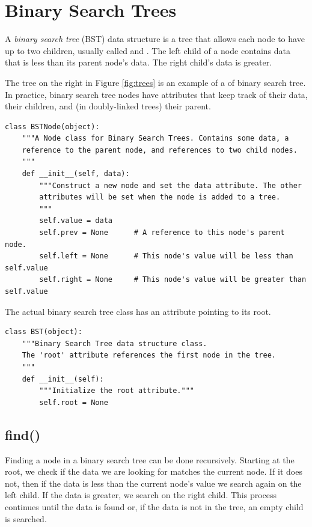 \section*{Binary Search Trees}

A \emph{binary search tree} (BST) data structure is a tree that allows each node to have up to two children, usually called  and .
The left child of a node contains data that is less than its parent node's data.
The right child's data is greater.

The tree on the right in Figure \ref{fig:trees} is an example of a of binary search tree.
In practice, binary search tree nodes have attributes that keep track of their data, their children, and (in doubly-linked trees) their parent.

\begin{lstlisting}
class BSTNode(object):
    """A Node class for Binary Search Trees. Contains some data, a
    reference to the parent node, and references to two child nodes.
    """
    def __init__(self, data):
        """Construct a new node and set the data attribute. The other
        attributes will be set when the node is added to a tree.
        """
        self.value = data
        self.prev = None      # A reference to this node's parent node.
        self.left = None      # This node's value will be less than self.value
        self.right = None     # This node's value will be greater than self.value
\end{lstlisting}

The actual binary search tree class has an attribute pointing to its root.

\begin{lstlisting}
class BST(object):
    """Binary Search Tree data structure class.
    The 'root' attribute references the first node in the tree.
    """
    def __init__(self):
        """Initialize the root attribute."""
        self.root = None
\end{lstlisting}

\subsection*{find()}

Finding a node in a binary search tree can be done recursively.
Starting at the root, we check if the data we are looking for matches the current node.
If it does not, then if the data is less than the current node's value we search again on the left child.
If the data is greater, we search on the right child.
This process continues until the data is found or, if the data is not in the tree, an empty child is searched.

